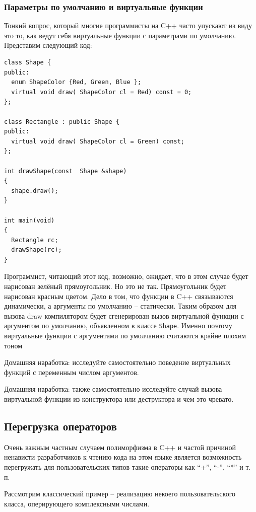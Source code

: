 \documentclass[a4paper,12pt,oneside]{article}
\begin{document}
\subsubsection{Параметры по умолчанию и виртуальные функции}

Тонкий вопрос, который многие программисты на C++ часто упускают из виду это то, как ведут себя виртуальные функции с параметрами по умолчанию. Представим следующий код:

\begin{lstlisting}
class Shape {
public:
  enum ShapeColor {Red, Green, Blue };
  virtual void draw( ShapeColor cl = Red) const = 0;
};

class Rectangle : public Shape {
public:
  virtual void draw( ShapeColor cl = Green) const;
};

int drawShape(const  Shape &shape)
{
  shape.draw();
}

int main(void)
{
  Rectangle rc;
  drawShape(rc);
}
\end{lstlisting}

Программист, читающий этот код, возможно, ожидает, что в этом случае будет нарисован зелёный прямоугольник. Но это не так. Прямоугольник будет нарисован красным цветом. Дело в том, что функции в C++ связываются динамически, а аргументы по умолчанию – статически. Таким образом для вызова draw компилятором будет сгенерирован вызов виртуальной функции с аргументом по умолчанию, объявленном в классе \lstinline!Shape!. Именно поэтому виртуальные функции с аргументами по умолчанию считаются крайне плохим тоном

Домашняя наработка: исследуйте самостоятельно поведение виртуальных функций с переменным числом аргументов.

Домашняя наработка: также самостоятельно исследуйте случай вызова виртуальной функции из конструктора или деструктора и чем это чревато.

\subsection{Перегрузка операторов}

Очень важным частным случаем полиморфизма в C++ и частой причиной ненависти разработчиков к чтению кода на этом языке является возможность перегружать для пользовательских типов такие операторы как ``+'', ``-'', ``*'' и т. п.

Рассмотрим классический пример – реализацию некоего пользовательского класса, оперирующего комплексными числами.
\end{document}
